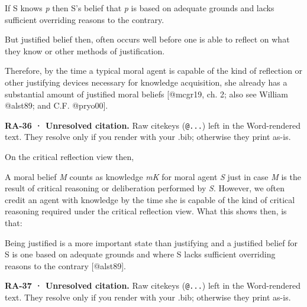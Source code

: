 \documentclass[
  letterpaper,
  DIV=11,
  numbers=noendperiod]{scrartcl}
\theoremstyle{remark}
\begin{document}
If S knows \emph{p} then S's belief that \emph{p} is based on adequate
grounds and lacks sufficient overriding reasons to the contrary.

But justified belief then, often occurs well before one is able to
reflect on what they know or other methods of justification.

Therefore, by the time a typical moral agent is capable of the kind of
reflection or other justifying devices necessary for knowledge
acquisition, she already has a substantial amount of justified moral
beliefs {[}@mcgr19, ch. 2; also see William @alst89; and C.F.
@pryo00{]}.

\begin{tcolorbox}[enhanced jigsaw, arc=.35mm, bottomrule=.15mm, bottomtitle=1mm, breakable, colback=white, colbacktitle=quarto-callout-warning-color!10!white, colframe=quarto-callout-warning-color-frame, coltitle=black, left=2mm, leftrule=.75mm, opacityback=0, opacitybacktitle=0.6, rightrule=.15mm, title=\textcolor{quarto-callout-warning-color}{\faExclamationTriangle}\hspace{0.5em}{Warning}, titlerule=0mm, toprule=.15mm, toptitle=1mm]

\textbf{RA-36 · Unresolved citation.} Raw citekeys (\texttt{@...}) left
in the Word-rendered text. They resolve only if you render with your
.bib; otherwise they print as-is.

\end{tcolorbox}

On the critical reflection view then,

A moral belief \emph{M} counts as knowledge \emph{mK} for moral agent
\emph{S} just in case \emph{M} is the result of critical reasoning or
deliberation performed by \emph{S}. However, we often credit an agent
with knowledge by the time she is capable of the kind of critical
reasoning required under the critical reflection view. What this shows
then, is that:

Being justified is a more important state than justifying and a
justified belief for S is one based on adequate grounds and where S
lacks sufficient overriding reasons to the contrary {[}@alst89{]}.

\begin{tcolorbox}[enhanced jigsaw, arc=.35mm, bottomrule=.15mm, bottomtitle=1mm, breakable, colback=white, colbacktitle=quarto-callout-warning-color!10!white, colframe=quarto-callout-warning-color-frame, coltitle=black, left=2mm, leftrule=.75mm, opacityback=0, opacitybacktitle=0.6, rightrule=.15mm, title=\textcolor{quarto-callout-warning-color}{\faExclamationTriangle}\hspace{0.5em}{Warning}, titlerule=0mm, toprule=.15mm, toptitle=1mm]

\textbf{RA-37 · Unresolved citation.} Raw citekeys (\texttt{@...}) left
in the Word-rendered text. They resolve only if you render with your
.bib; otherwise they print as-is.

\end{tcolorbox}
\end{document}
